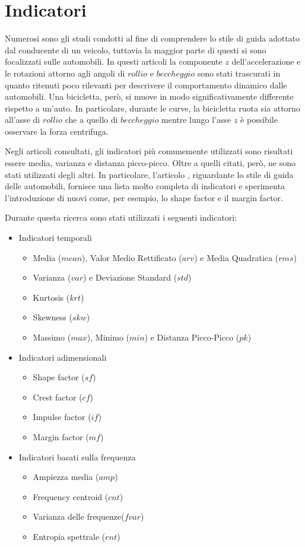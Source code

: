 \documentclass[class=article]{standalone}
\begin{document}
\section{Indicatori}
	Numerosi sono gli studi condotti al fine di comprendere lo stile di guida adottato dal conducente di un veicolo, tuttavia la maggior parte di questi si sono focalizzati sulle automobili.
	In questi articoli la componente \(z\) dell'accelerazione e le rotazioni attorno agli angoli di \(rollio\) e \(beccheggio\) sono stati trascurati in quanto ritenuti poco rilevanti per descrivere il comportamento dinamico dalle automobili.
	Una bicicletta, però, si muove in modo significativamente differente rispetto a un'auto.
	In particolare, durante le curve, la bicicletta ruota sia attorno all'asse di \(rollio\) che a quello di \(beccheggio\) mentre lungo l'asse \(z\) è possibile osservare la forza centrifuga.
	
	
	Negli articoli consultati, gli indicatori più comunemente utilizzati sono risultati essere media, varianza e distanza picco-picco. Oltre a quelli citati, però, ne sono stati utilizzati degli altri. In particolare, l'articolo \cite{chen}, riguardante lo stile di guida delle automobili, fornisce una lista molto completa di indicatori e sperimenta l'introduzione di nuovi come, per esempio, lo shape factor e il margin factor.\hfill\break
	
	
	Durante questa ricerca sono stati utilizzati i seguenti indicatori:
	\begin{itemize}
		\item Indicatori temporali
		\begin{itemize}
			\item Media (\(mean\)), Valor Medio Rettificato (\(arv\)) e Media Quadratica (\(rms\))
			\item Varianza (\(var\)) e Deviazione Standard (\(std\))
			\item Kurtosis (\(krt\))
			\item Skewness (\(skw\))
			\item Massimo (\(max\)), Minimo (\(min\)) e Distanza Picco-Picco (\(pk\))
		\end{itemize}
		\item Indicatori adimensionali
		\begin{itemize}
			\item Shape factor (\(sf\))
			\item Crest factor (\(cf\))
			\item Impulse factor (\(if\))
			\item Margin factor (\(mf\))
		\end{itemize}
		\item Indicatori basati sulla frequenza
		\begin{itemize}
			\item Ampiezza media (\(amp\))
			\item Frequency centroid (\(cnt\))
			\item Varianza delle frequenze(\(fvar\))
			\item Entropia spettrale (\(ent\))
		\end{itemize}
	\end{itemize}
	
\end{document}

